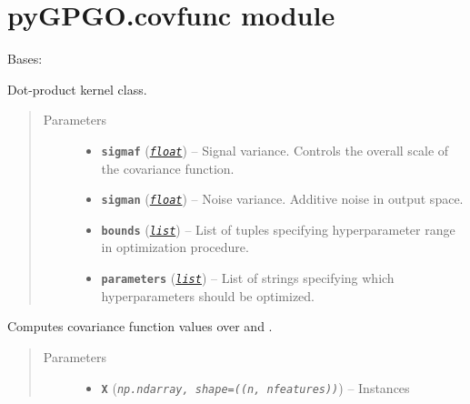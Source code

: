 \documentclass[letterpaper,10pt,english]{sphinxmanual}
\begin{document}
\section{pyGPGO.covfunc module}
\label{pyGPGO.covfunc:pygpgo-covfunc-module}\label{pyGPGO.covfunc:module-pyGPGO.covfunc}\label{pyGPGO.covfunc::doc}

\begin{fulllineitems}
\label{pyGPGO.covfunc:pyGPGO.covfunc.dotProd}
Bases: \href{https://docs.python.org/2/library/functions.html\#object}{}

Dot-product kernel class.
\begin{quote}\begin{description}
\item[{Parameters}] \leavevmode\begin{itemize}
\item {} 
\textbf{\texttt{sigmaf}} (\href{https://docs.python.org/2/library/functions.html\#float}{\emph{\texttt{float}}}) -- Signal variance. Controls the overall scale of the covariance function.

\item {} 
\textbf{\texttt{sigman}} (\href{https://docs.python.org/2/library/functions.html\#float}{\emph{\texttt{float}}}) -- Noise variance. Additive noise in output space.

\item {} 
\textbf{\texttt{bounds}} (\href{https://docs.python.org/2/library/functions.html\#list}{\emph{\texttt{list}}}) -- List of tuples specifying hyperparameter range in optimization procedure.

\item {} 
\textbf{\texttt{parameters}} (\href{https://docs.python.org/2/library/functions.html\#list}{\emph{\texttt{list}}}) -- List of strings specifying which hyperparameters should be optimized.

\end{itemize}

\end{description}\end{quote}

\begin{fulllineitems}
\label{pyGPGO.covfunc:pyGPGO.covfunc.dotProd.K}
Computes covariance function values over  and .
\begin{quote}\begin{description}
\item[{Parameters}] \leavevmode\begin{itemize}
\item {} 
\textbf{\texttt{X}} (\emph{\texttt{np.ndarray, shape=((n, nfeatures))}}) -- Instances


\end{itemize}
\end{description}
\end{quote}
\end{fulllineitems}
\end{fulllineitems}
\end{document}
